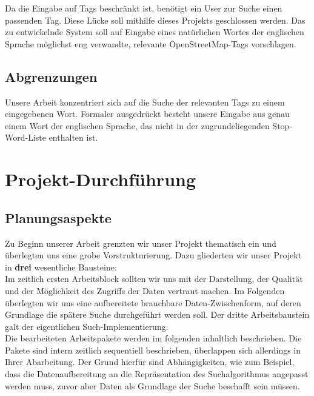 \documentclass[12pt,pdftex,a4paper]{article}
\begin{document}
Da die Eingabe auf Tags beschränkt ist, benötigt ein User zur Suche einen passenden Tag. Diese Lücke soll mithilfe dieses Projekts geschlossen werden. Das zu entwickelnde System soll auf Eingabe eines natürlichen Wortes der englischen Sprache möglichst eng verwandte, relevante OpenStreetMap-Tags vorschlagen.

\subsection{Abgrenzungen}
Unsere Arbeit konzentriert sich auf die Suche der relevanten Tags zu einem eingegebenen Wort. Formaler ausgedrückt besteht unsere Eingabe aus genau einem Wort der englischen Sprache, das nicht in der zugrundeliegenden Stop-Word-Liste enthalten ist.


\section{Projekt-Durchführung}
\subsection{Planungsaspekte}
Zu Beginn unserer Arbeit grenzten wir unser Projekt thematisch ein und überlegten uns eine grobe Vorstrukturierung.
Dazu gliederten wir unser Projekt in \textbf{drei} wesentliche Bausteine:\\
Im zeitlich ersten Arbeitsblock sollten wir uns mit der Darstellung, der Qualität und der Möglichkeit des Zugriffs der Daten vertraut machen. Im Folgenden überlegten wir uns eine aufbereitete brauchbare Daten-Zwischenform, auf deren Grundlage die spätere Suche durchgeführt werden soll. Der dritte Arbeitsbaustein galt der eigentlichen Such-Implementierung.\\
Die bearbeiteten Arbeitspakete werden im folgenden inhaltlich beschrieben. Die Pakete sind intern zeitlich sequentiell beschrieben, überlappen sich allerdings in Ihrer Abarbeitung. Der Grund hierfür sind Abhängigkeiten, wie zum Beispiel, dass die Datenaufbereitung an die Repräsentation des Suchalgorithmus angepasst werden muss, zuvor aber Daten als Grundlage der Suche beschafft sein müssen.
\end{document}
